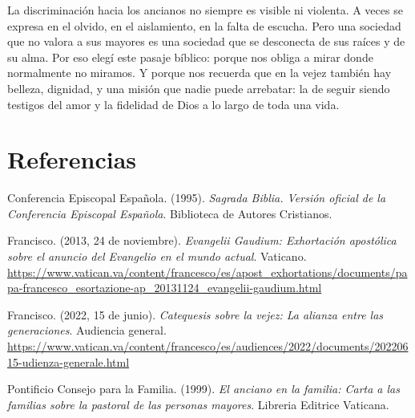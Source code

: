 \documentclass[12pt]{article}
\begin{document}
La discriminación hacia los ancianos no siempre es visible ni violenta. A veces se expresa en el olvido, en el aislamiento, en la falta de escucha. Pero una sociedad que no valora a sus mayores es una sociedad que se desconecta de sus raíces y de su alma. Por eso elegí este pasaje bíblico: porque nos obliga a mirar donde normalmente no miramos. Y porque nos recuerda que en la vejez también hay belleza, dignidad, y una misión que nadie puede arrebatar: la de seguir siendo testigos del amor y la fidelidad de Dios a lo largo de toda una vida.
\section*{Referencias}

Conferencia Episcopal Española. (1995). \emph{Sagrada Biblia. Versión oficial de la Conferencia Episcopal Española}. Biblioteca de Autores Cristianos.

Francisco. (2013, 24 de noviembre). \emph{Evangelii Gaudium: Exhortación apostólica sobre el anuncio del Evangelio en el mundo actual}. Vaticano. \url{https://www.vatican.va/content/francesco/es/apost_exhortations/documents/papa-francesco_esortazione-ap_20131124_evangelii-gaudium.html} 

Francisco. (2022, 15 de junio). \emph{Catequesis sobre la vejez: La alianza entre las generaciones}. Audiencia general. \url{https://www.vatican.va/content/francesco/es/audiences/2022/documents/20220615-udienza-generale.html} 

Pontificio Consejo para la Familia. (1999). \emph{El anciano en la familia: Carta a las familias sobre la pastoral de las personas mayores}. Libreria Editrice Vaticana.
\end{document}
